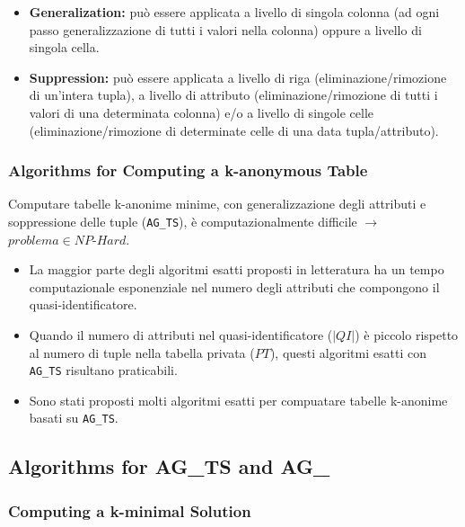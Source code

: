 \documentclass{report}
\begin{document}
\begin{itemize}
    \item \textbf{Generalization:} può essere applicata a livello di singola colonna (ad ogni passo generalizzazione di tutti i valori nella colonna) oppure a livello di singola cella.
    \item \textbf{Suppression:} può essere applicata a livello di riga (eliminazione/rimozione di un'intera tupla), a livello di attributo (eliminazione/rimozione di tutti i valori di una determinata colonna) e/o a livello di singole celle (eliminazione/rimozione di determinate celle di una data tupla/attributo).
\end{itemize}

\subsubsection{Algorithms for Computing a k-anonymous Table}
Computare tabelle k-anonime minime, con generalizzazione degli attributi e soppressione delle tuple (\texttt{AG\_TS}), è computazionalmente difficile $ \rightarrow $ \(problema \in NP\text{-}Hard \). 
\begin{itemize}
    \item La maggior parte degli algoritmi esatti proposti in letteratura ha un tempo computazionale esponenziale nel numero degli attributi che compongono il quasi-identificatore.
    \item Quando il numero di attributi nel quasi-identificatore (\(|QI|\)) è piccolo rispetto al numero di tuple nella tabella privata (\(PT\)), questi algoritmi esatti con \texttt{AG\_TS} risultano praticabili.
    \item Sono stati proposti molti algoritmi esatti per compuatare tabelle k-anonime basati su \texttt{AG\_TS}.
\end{itemize}


\subsection{Algorithms for \textbf{AG\_TS} and \textbf{AG\_}}

\subsubsection{Computing a k-minimal Solution}
\end{document}
